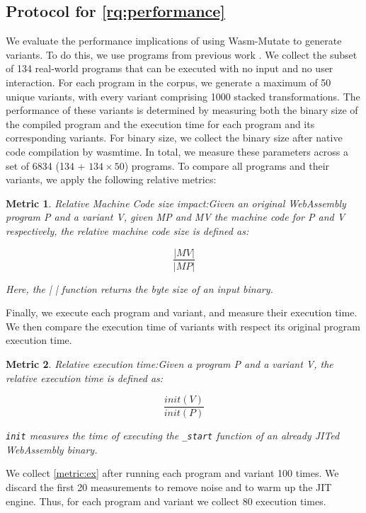 \documentclass[a4paper,fleqn]{cas-dc}
\newcommand{\tool}{{\sc Wasm-Mutate}\xspace}
\newcommand{\Wasm}{WebAssembly\xspace}
\newtheorem{metric}{Metric}
\newenvironment{revision1}{\color{blue}}{}
\begin{document}
\begin{revision1}

\subsection{Protocol for \ref{rq:performance}}
We evaluate the performance implications of using \tool to generate variants. 
To do this, we use programs from previous work \cite{hilbig2021empirical}. 
We collect the subset of 134 real-world programs that can be executed with no input and no user interaction.
For each program in the corpus, we generate a maximum of 50 unique variants, with every variant comprising 1000 stacked transformations. 
The performance of these variants is determined by measuring both the binary size of the compiled program and the execution time for each program and its corresponding variants. 
For binary size, we collect the  binary size after native code compilation by wasmtime.
In total, we measure these parameters across a set of 6834 (134 + $134\times50$) programs. 
To compare all programs and their variants, we apply the following relative metrics:


\begin{metric}{Relative Machine Code size impact:}\label{metric:mcize} Given an original \Wasm program P and a variant V, given MP and MV the machine code for P and V respectively, the relative machine code size is defined as:

$$
    \frac{|MV|}{|MP|}
$$

Here, the \textit{| |} function returns the byte size of an input binary.     
\end{metric}

Finally, we execute each program and variant, and measure their execution time. 
We then compare the execution time of variants with respect its original program execution time.

\begin{metric}{Relative execution time:}\label{metric:ex}
Given a program P and a variant V, the relative execution time is defined as:

$$
    \frac{init(V)}{init(P)}
$$

\texttt{init} measures the time of executing the \texttt{_start} function of an already JITed \Wasm binary.
\end{metric}

We collect \autoref{metric:ex} after running each program and variant 100 times.
We discard the first 20 measurements to remove noise and to warm up the JIT engine.
Thus, for each program and variant we collect 80 execution times.
  
\end{revision1}
\end{document}
